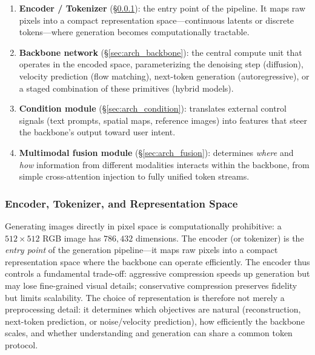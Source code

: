 \documentclass{llmxive}
\begin{document}
\begin{enumerate}[leftmargin=*,itemsep=2pt]
    \item \textbf{Encoder / Tokenizer} (\S\ref{sec:arch_encoder}): the entry point of the pipeline. It maps raw pixels into a compact representation space---continuous latents or discrete tokens---where generation becomes computationally tractable.
    \item \textbf{Backbone network} (\S\ref{sec:arch_backbone}): the central compute unit that operates in the encoded space, parameterizing the denoising step (diffusion), velocity prediction (flow matching), next-token generation (autoregressive), or a staged combination of these primitives (hybrid models).
    \item \textbf{Condition module} (\S\ref{sec:arch_condition}): translates external control signals (text prompts, spatial maps, reference images) into features that steer the backbone's output toward user intent.
    \item \textbf{Multimodal fusion module} (\S\ref{sec:arch_fusion}): determines \emph{where} and \emph{how} information from different modalities interacts within the backbone, from simple cross-attention injection to fully unified token streams.
\end{enumerate}






\subsubsection{Encoder, Tokenizer, and Representation Space}
\label{sec:arch_encoder}

Generating images directly in pixel space is computationally prohibitive: a $512 \times 512$ RGB image has $786{,}432$ dimensions. The encoder (or tokenizer) is the \emph{entry point} of the generation pipeline---it maps raw pixels into a compact representation space where the backbone can operate efficiently. The encoder thus controls a fundamental trade-off: aggressive compression speeds up generation but may lose fine-grained visual details; conservative compression preserves fidelity but limits scalability. The choice of representation is therefore not merely a preprocessing detail: it determines which objectives are natural (reconstruction, next-token prediction, or noise/velocity prediction), how efficiently the backbone scales, and whether understanding and generation can share a common token protocol.
\end{document}
